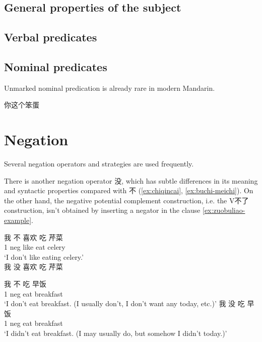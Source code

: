\documentclass[UTF8, a4paper, oneside, scheme=plain, 12pt]{ctexrep}
\newcommand{\translate}[1]{`#1'}
\begin{document}
\subsection{General properties of the subject}

\subsection{Verbal predicates}

\subsection{Nominal predicates}

Unmarked nominal predication is already rare in modern Mandarin.

\begin{exe}
    \ex 你这个笨蛋
\end{exe}

\section{Negation}\label{sec:negation}


Several negation operators and strategies are used frequently.

There is another negation operator 没, 
which has subtle differences in its meaning and syntactic properties compared with 不
(\ref{ex:chiqincai}, \ref{ex:buchi-meichi}).
On the other hand, the negative potential complement construction,
i.e. the V不了 construction,
isn't obtained by inserting a negator in the clause \eqref{ex:zuobuliao-example}.

\begin{exe}
    \ex \begin{xlist}
        \ex \gll 我 不 喜欢 吃 芹菜 \\
        1 \acs{neg} like eat celery \\
        \glt \translate{I don't like eating celery.} \\
        \ex * 我 没 喜欢 吃 芹菜
    \end{xlist}
    \label{ex:chiqincai}
\end{exe}

\begin{exe}
    \ex \begin{xlist}
        \ex \gll 我 不 吃 早饭 \\
        1 \acs{neg} eat breakfast \\
        \glt \translate{I don't eat breakfast. (I usually don't, I don't want any today, etc.)}
        \ex \gll 我 没 吃 早饭 \\
        1 \acs{neg} eat breakfast \\
        \glt \translate{I didn't eat breakfast. (I may usually do, but somehow I didn't today.)}
    \end{xlist}
    \label{ex:buchi-meichi}
\end{exe}
\end{document}
